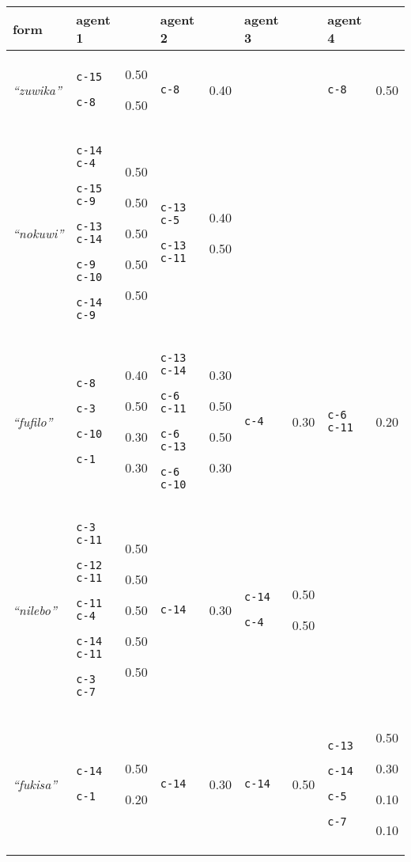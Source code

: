 
{\footnotesize\renewcommand{\arraystretch}{1.5}
\begin{tabular}{@{}p{1.2cm}|p{1.6cm}@{}p{0.8cm}@{}|p{1.6cm}@{}p{0.8cm}@{}|p{1.6cm}@{}p{0.8cm}@{}|p{1.6cm}@{}p{0.8cm}@{}}
form & agent 1 &  & agent 2 &  & agent 3 &  & agent 4 & \\
\hline
\textit{``zuwika''}&\texttt{c-15}


\texttt{c-8}
&0.50

0.50&\texttt{c-8}
&0.40&&&\texttt{c-8}
&0.50\\
\hline
\textit{``nokuwi''}&\texttt{c-14 c-4}


\texttt{c-15 c-9}


\texttt{c-13 c-14}


\texttt{c-9 c-10}


\texttt{c-14 c-9}
&0.50

0.50

0.50

0.50

0.50&\texttt{c-13 c-5}


\texttt{c-13 c-11}
&0.40

0.50&&&&\\
\hline
\textit{``fufilo''}&\texttt{c-8}


\texttt{c-3}


\texttt{c-10}


\texttt{c-1}
&0.40

0.50

0.30

0.30&\texttt{c-13 c-14}


\texttt{c-6 c-11}


\texttt{c-6 c-13}


\texttt{c-6 c-10}
&0.30

0.50

0.50

0.30&\texttt{c-4}
&0.30&\texttt{c-6 c-11}
&0.20\\
\hline
\textit{``nilebo''}&\texttt{c-3 c-11}


\texttt{c-12 c-11}


\texttt{c-11 c-4}


\texttt{c-14 c-11}


\texttt{c-3 c-7}
&0.50

0.50

0.50

0.50

0.50&\texttt{c-14}
&0.30&\texttt{c-14}


\texttt{c-4}
&0.50

0.50&&\\

\hline
\textit{``fukisa''}&\texttt{c-14}


\texttt{c-1}
&0.50

0.20&\texttt{c-14}
&0.30&\texttt{c-14}
&0.50&\texttt{c-13}


\texttt{c-14}


\texttt{c-5}


\texttt{c-7}
&0.50

0.30

0.10

0.10
\end{tabular}}
